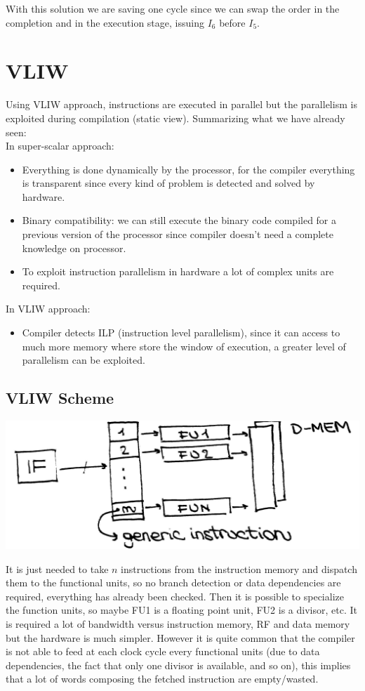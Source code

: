 With this solution we are saving one cycle since we can swap the order in the completion and in the execution stage, issuing $I_6$ before $I_5$.


\section{VLIW}

Using VLIW approach, instructions are executed in parallel but the parallelism is exploited during compilation (static view). Summarizing what we have already seen:\\

In super-scalar approach:
\begin{itemize}
  \item Everything is done dynamically by the processor, for the compiler everything is transparent since every kind of problem is detected and solved by hardware.
  \item Binary compatibility: we can still execute the binary code compiled for a previous version of the processor since compiler doesn't need a complete knowledge on processor.
  \item To exploit instruction parallelism in hardware a lot of complex units are required.
\end{itemize}

In VLIW approach:
\begin{itemize}
  \item Compiler detects ILP (instruction level parallelism), since it can access to much more memory where store the window of execution, a greater level of parallelism can be exploited.
\end{itemize}

\subsection{VLIW Scheme}
\begin{center}
  \includegraphics[width=0.7\linewidth]{img/img3/6}
\end{center}


It is just needed to take $n$ instructions from the instruction memory and dispatch them to the functional units, so no branch detection or data dependencies are required, everything has already been checked. Then it is possible to specialize the function units, so maybe FU1 is a floating point unit, FU2 is a divisor, etc. It is required a lot of bandwidth versus instruction memory, RF and data memory but the hardware is much simpler. However it is quite common that the compiler is not able to feed at each clock cycle every functional units (due to data dependencies, the fact that only one divisor is available, and so on), this implies that a lot of words composing the fetched  instruction are empty/wasted.

